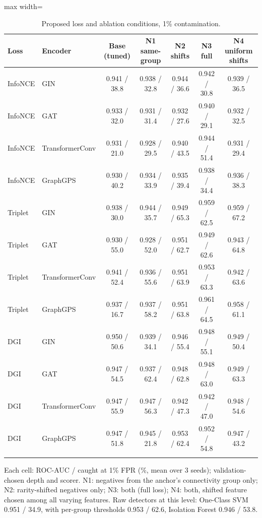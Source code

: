 \begin{table}[htbp]
\centering
\footnotesize
\caption{Proposed loss and ablation conditions, 1\% contamination.}
\label{tab:newloss-1pct}
\begin{adjustbox}{max width=\linewidth}
\begin{tabular}{llccccc}
\toprule
Loss & Encoder & Base (tuned) & N1 same-group & N2 shifts & N3 full & N4 uniform shifts \\
\midrule
InfoNCE & GIN & 0.941 / 38.8 & 0.938 / 32.8 & 0.944 / 36.6 & 0.942 / 30.8 & 0.939 / 36.5 \\
InfoNCE & GAT & 0.933 / 32.0 & 0.931 / 31.4 & 0.932 / 27.6 & 0.940 / 29.1 & 0.932 / 32.5 \\
InfoNCE & TransformerConv & 0.931 / 21.0 & 0.928 / 29.5 & 0.940 / 43.5 & 0.944 / 51.4 & 0.931 / 29.4 \\
InfoNCE & GraphGPS & 0.930 / 40.2 & 0.934 / 33.9 & 0.935 / 39.4 & 0.938 / 34.4 & 0.936 / 38.3 \\
\addlinespace
Triplet & GIN & 0.938 / 30.0 & 0.944 / 35.7 & 0.949 / 65.3 & 0.959 / 62.5 & 0.959 / 67.2 \\
Triplet & GAT & 0.930 / 55.0 & 0.928 / 52.0 & 0.951 / 62.7 & 0.949 / 62.6 & 0.943 / 64.8 \\
Triplet & TransformerConv & 0.941 / 52.4 & 0.936 / 55.6 & 0.951 / 63.9 & 0.953 / 63.3 & 0.942 / 63.6 \\
Triplet & GraphGPS & 0.937 / 16.7 & 0.937 / 58.2 & 0.951 / 63.8 & 0.961 / 64.5 & 0.958 / 61.1 \\
\addlinespace
DGI & GIN & 0.950 / 50.6 & 0.939 / 34.1 & 0.946 / 55.4 & 0.948 / 55.1 & 0.949 / 50.4 \\
DGI & GAT & 0.947 / 54.5 & 0.937 / 62.4 & 0.948 / 62.8 & 0.948 / 63.0 & 0.949 / 63.3 \\
DGI & TransformerConv & 0.947 / 55.9 & 0.947 / 56.3 & 0.942 / 47.3 & 0.942 / 47.0 & 0.948 / 54.6 \\
DGI & GraphGPS & 0.947 / 51.8 & 0.945 / 21.8 & 0.953 / 62.4 & 0.952 / 54.8 & 0.947 / 43.2 \\
\addlinespace
\bottomrule
\end{tabular}
\end{adjustbox}
\par\smallskip
\parbox{0.95\linewidth}{\footnotesize Each cell: ROC-AUC / caught at 1\% FPR (\%, mean over 3 seeds); validation-chosen depth and scorer. N1: negatives from the anchor's connectivity group only; N2: rarity-shifted negatives only; N3: both (full loss); N4: both, shifted feature chosen among all varying features. Raw detectors at this level: One-Class SVM 0.951 / 34.9, with per-group thresholds 0.953 / 62.6, Isolation Forest 0.946 / 53.8.}
\end{table}
